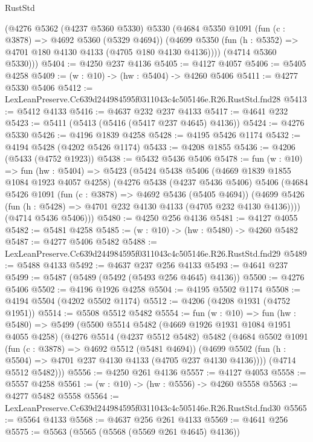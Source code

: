 \begin{lexlean}{RustStd}
\begin{coremodule}
      (@4276
        @5362
        (@4237 @5360 @5330)
        @5330
        (@4684
          @5350
          @1091
          (fun (c : @3878) => @4692 @5360 (@5329 @4694))
          (@4699 @5350 (fun (h : @5352) => @4701 @180 @4130 @4133 (@4705 @180 @4130 @4136))))
        (@4714 @5360 @5330)))
@5404 := @4250 @237 @4136
@5405 := @4127 @4057
@5406 := @5405 @4258
@5409 := (w : @10) -> (hw : @5404) -> @4260 @5406
@5411 := @4277 @5330 @5406
@5412 := LexLeanPreserve.Cc639d244984595f0311043c4c505146e.R26.RustStd.fnd28
@5413 := @5412 @4133
@5416 := @4637 @232 @237 @4133
@5417 := @4641 @232
@5423 := @5411 (@5413 (@5416 (@5417 @237 @4645) @4136))
@5424 := @4276 @5330
@5426 := @4196 @1839 @4258
@5428 := @4195 @5426 @1174
@5432 := @4194 @5428 (@4202 @5426 @1174)
@5433 := @4208 @1855
@5436 := @4206 (@5433 (@4752 @1923))
@5438 := @5432 @5436 @5406
@5478 := fun (w : @10) =>
  fun (hw : @5404) =>
  @5423
    (@5424
      @5438
      @5406
      (@4669 @1839 @1855 @1084 @1923 @4057 @4258)
      (@4276
        @5438
        (@4237 @5436 @5406)
        @5406
        (@4684
          @5426
          @1091
          (fun (c : @3878) => @4692 @5436 (@5405 @4694))
          (@4699 @5426 (fun (h : @5428) => @4701 @232 @4130 @4133 (@4705 @232 @4130 @4136))))
        (@4714 @5436 @5406)))
@5480 := @4250 @256 @4136
@5481 := @4127 @4055
@5482 := @5481 @4258
@5485 := (w : @10) -> (hw : @5480) -> @4260 @5482
@5487 := @4277 @5406 @5482
@5488 := LexLeanPreserve.Cc639d244984595f0311043c4c505146e.R26.RustStd.fnd29
@5489 := @5488 @4133
@5492 := @4637 @237 @256 @4133
@5493 := @4641 @237
@5499 := @5487 (@5489 (@5492 (@5493 @256 @4645) @4136))
@5500 := @4276 @5406
@5502 := @4196 @1926 @4258
@5504 := @4195 @5502 @1174
@5508 := @4194 @5504 (@4202 @5502 @1174)
@5512 := @4206 (@4208 @1931 (@4752 @1951))
@5514 := @5508 @5512 @5482
@5554 := fun (w : @10) =>
  fun (hw : @5480) =>
  @5499
    (@5500
      @5514
      @5482
      (@4669 @1926 @1931 @1084 @1951 @4055 @4258)
      (@4276
        @5514
        (@4237 @5512 @5482)
        @5482
        (@4684
          @5502
          @1091
          (fun (c : @3878) => @4692 @5512 (@5481 @4694))
          (@4699 @5502 (fun (h : @5504) => @4701 @237 @4130 @4133 (@4705 @237 @4130 @4136))))
        (@4714 @5512 @5482)))
@5556 := @4250 @261 @4136
@5557 := @4127 @4053
@5558 := @5557 @4258
@5561 := (w : @10) -> (hw : @5556) -> @4260 @5558
@5563 := @4277 @5482 @5558
@5564 := LexLeanPreserve.Cc639d244984595f0311043c4c505146e.R26.RustStd.fnd30
@5565 := @5564 @4133
@5568 := @4637 @256 @261 @4133
@5569 := @4641 @256
@5575 := @5563 (@5565 (@5568 (@5569 @261 @4645) @4136))

\end{coremodule}
\end{lexlean}
